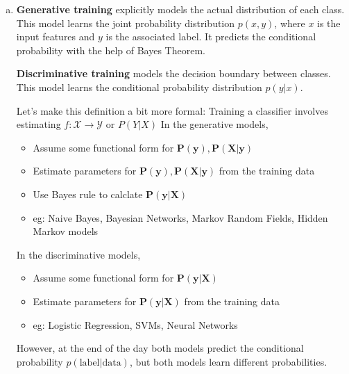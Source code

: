 \documentclass[fleqn]{article}
\begin{document}
\begin{enumerate}[a)]
	\item 
	\textbf{Generative training} explicitly models the actual distribution of each class. This model learns the joint probability distribution $p(x, y)$, where $x$ is the input features and $y$ is the associated label. It predicts the conditional probability with the help of Bayes Theorem.
	
	\textbf{Discriminative training} models the decision boundary between classes. This model learns the conditional probability distribution $p(y|x)$.
	
	Let's make this definition a bit more formal:
	Training a classifier involves estimating $f : \mathcal{X} \rightarrow \mathcal{Y}$ or $P
	(Y|X)$
	In the generative models,
	\begin{itemize}
		\item Assume some functional form for $\bm{P(y), P(X|y)}$
		\item Estimate parameters for $\bm{P(y), P(X|y)}$ from the training data
		\item Use Bayes rule to calclate $\bm{P(y|X)}$
		\item eg: Naive Bayes, Bayesian Networks, Markov Random Fields, Hidden Markov models
	\end{itemize}
	
	In the discriminative models,
	\begin{itemize}
		\item Assume some functional form for $\bm{P(y|X)}$
		\item Estimate parameters for $\bm{P(y|X)}$ from the training data
		\item eg: Logistic Regression, SVMs, Neural Networks
	\end{itemize}

	However, at the end of the day both models predict the conditional probability $p(\text{label} | \text{data})$, but both models learn different probabilities.
	

\end{enumerate}
\end{document}
